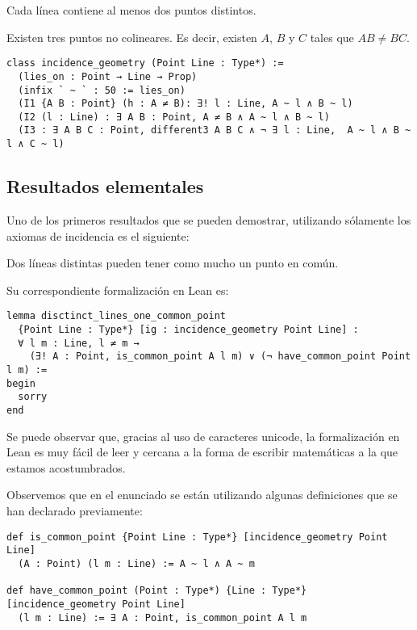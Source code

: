 \begin{ax}\label{I2}
	Cada línea contiene al menos dos puntos distintos.
\end{ax}

\begin{ax}\label{I3}
	Existen tres puntos no colineares. Es decir, existen $A$, $B$ y $C$ tales que
	$AB\neq BC$.
\end{ax}

\begin{lstlisting}
class incidence_geometry (Point Line : Type*) :=
  (lies_on : Point → Line → Prop)
  (infix ` ~ ` : 50 := lies_on)
  (I1 {A B : Point} (h : A ≠ B): ∃! l : Line, A ~ l ∧ B ~ l)
  (I2 (l : Line) : ∃ A B : Point, A ≠ B ∧ A ~ l ∧ B ~ l)
  (I3 : ∃ A B C : Point, different3 A B C ∧ ¬ ∃ l : Line,  A ~ l ∧ B ~ l ∧ C ~ l)
\end{lstlisting}

\subsection{Resultados elementales}

Uno de los primeros resultados que se pueden demostrar, utilizando sólamente los
axiomas de incidencia es el siguiente:

\begin{prop}
	Dos líneas distintas pueden tener como mucho un punto en común.
\end{prop}


Su correspondiente formalización en Lean es:


\begin{lstlisting}
lemma disctinct_lines_one_common_point
  {Point Line : Type*} [ig : incidence_geometry Point Line] :
  ∀ l m : Line, l ≠ m →
    (∃! A : Point, is_common_point A l m) ∨ (¬ have_common_point Point l m) :=
begin
  sorry
end
\end{lstlisting}


Se puede observar que, gracias al uso de caracteres unicode, la formalización en
Lean es muy fácil de leer y cercana a la forma de escribir matemáticas a la que
estamos acostumbrados.


Observemos que en el enunciado se están utilizando algunas definiciones que se
han declarado previamente:

\begin{lstlisting}
def is_common_point {Point Line : Type*} [incidence_geometry Point Line]
  (A : Point) (l m : Line) := A ~ l ∧ A ~ m

def have_common_point (Point : Type*) {Line : Type*} [incidence_geometry Point Line]
  (l m : Line) := ∃ A : Point, is_common_point A l m
\end{lstlisting}

